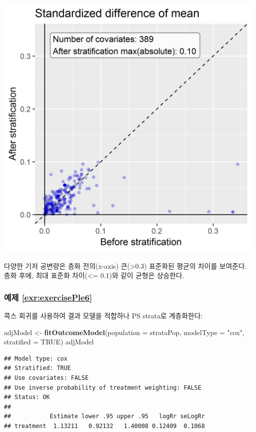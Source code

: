 \documentclass[10.5pt]{book}
\newenvironment{Shaded}{\begin{snugshade}}{\end{snugshade}}
\newcommand{\KeywordTok}[1]{\textcolor[rgb]{0.13,0.29,0.53}{\textbf{#1}}}
\newcommand{\DataTypeTok}[1]{\textcolor[rgb]{0.13,0.29,0.53}{#1}}
\newcommand{\StringTok}[1]{\textcolor[rgb]{0.31,0.60,0.02}{#1}}
\newcommand{\OtherTok}[1]{\textcolor[rgb]{0.56,0.35,0.01}{#1}}
\newcommand{\NormalTok}[1]{#1}
\theoremstyle{definition}
\theoremstyle{definition}
\theoremstyle{definition}
\theoremstyle{remark}
\begin{document}
\begin{center}\includegraphics[width=0.7\linewidth]{images/SuggestedAnswers/scatter} \end{center}

다양한 기저 공변량은 층화 전의(x-axis) 큰(\textgreater{}0.3) 표준화된
평균의 차이를 보여준다. 층화 후에, 최대 표준화 차이(\textless{}= 0.1)와
같이 균형은 상승한다.

\subsubsection*{예제 \ref{exr:exercisePle6}}\label{-refexrexerciseple6}

콕스 회귀를 사용하여 결과 모델을 적합하나 PS strata로 계층화한다:

\begin{Shaded}
\begin{Highlighting}[]
\NormalTok{adjModel <-}\StringTok{ }\KeywordTok{fitOutcomeModel}\NormalTok{(}\DataTypeTok{population =}\NormalTok{ strataPop,}
                         \DataTypeTok{modelType =} \StringTok{"cox"}\NormalTok{,}
                         \DataTypeTok{stratified =} \OtherTok{TRUE}\NormalTok{)}
\NormalTok{adjModel}
\end{Highlighting}
\end{Shaded}

\begin{verbatim}
## Model type: cox
## Stratified: TRUE
## Use covariates: FALSE
## Use inverse probability of treatment weighting: FALSE
## Status: OK
## 
##           Estimate lower .95 upper .95   logRr seLogRr
## treatment  1.13211   0.92132   1.40008 0.12409  0.1068
\end{verbatim}
\end{document}
